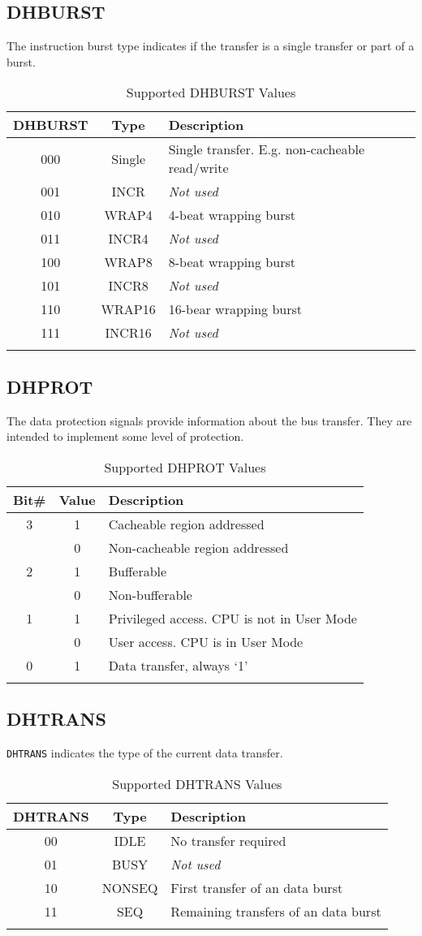 \subsection{DHBURST}\label{dhburst}

The instruction burst type indicates if the transfer is a single
transfer or part of a burst.

\begin{longtable}[]{@{}ccl@{}}
\toprule
DHBURST & Type & Description\tabularnewline
\midrule
\endhead
000 & Single & Single transfer. E.g. non-cacheable
read/write\tabularnewline
001 & INCR & \emph{Not used}\tabularnewline
010 & WRAP4 & 4-beat wrapping burst\tabularnewline
011 & INCR4 & \emph{Not used}\tabularnewline
100 & WRAP8 & 8-beat wrapping burst\tabularnewline
101 & INCR8 & \emph{Not used}\tabularnewline
110 & WRAP16 & 16-bear wrapping burst\tabularnewline
111 & INCR16 & \emph{Not used}\tabularnewline
\bottomrule
\caption{Supported DHBURST Values}
\label{tab:dhburst-values}
\end{longtable}


\subsection{DHPROT}\label{dhprot}

The data protection signals provide information about the bus transfer.
They are intended to implement some level of protection.

\begin{longtable}[]{@{}ccl@{}}
\toprule
Bit\# & Value & Description\tabularnewline
\midrule
\endhead
3 & 1 & Cacheable region addressed\tabularnewline
& 0 & Non-cacheable region addressed\tabularnewline
2 & 1 & Bufferable\tabularnewline
& 0 & Non-bufferable\tabularnewline
1 & 1 & Privileged access. CPU is not in User Mode\tabularnewline
& 0 & User access. CPU is in User Mode\tabularnewline
0 & 1 & Data transfer, always `1'\tabularnewline
\bottomrule
\caption{Supported DHPROT Values}
\label{tab:dhprot-values}
\end{longtable}

\subsection{DHTRANS}\label{dhtrans}

\texttt{DHTRANS} indicates the type of the current data transfer.

\begin{longtable}[]{@{}ccl@{}}
\toprule
DHTRANS & Type & Description\tabularnewline
\midrule
\endhead
00 & IDLE & No transfer required\tabularnewline
01 & BUSY & \emph{Not used}\tabularnewline
10 & NONSEQ & First transfer of an data burst\tabularnewline
11 & SEQ & Remaining transfers of an data burst\tabularnewline
\bottomrule
\caption{Supported DHTRANS Values}
\label{tab:dhtrans-values}
\end{longtable}


